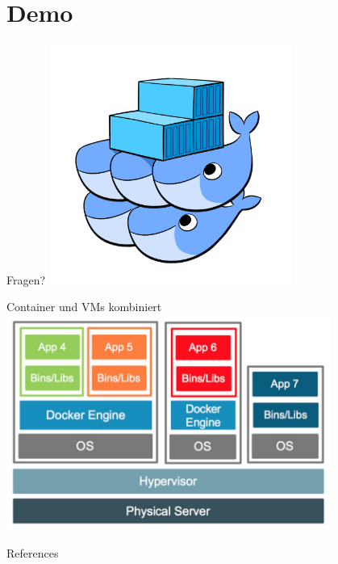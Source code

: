 \documentclass[10pt]{beamer}
\begin{document}
\section{Demo}

\begin{frame}{Fragen?}
  \center
  \includegraphics[width=0.6\textwidth]{../images/14-docker-swarm-hero2.png}

\end{frame}

\begin{frame}{Container und VMs kombiniert}
  \center
  \includegraphics[width=0.8\textwidth]{../images/7-container-vm-combined.jpg}
\end{frame}

\appendix

\begin{frame}[allowframebreaks]{References}

  \printbibliography

\end{frame}
\end{document}
